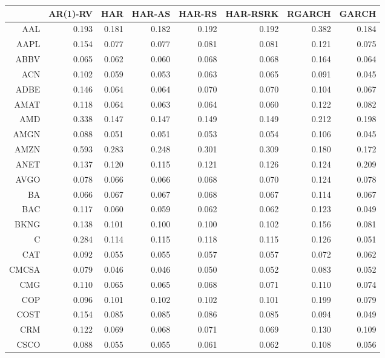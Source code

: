 \begin{table}[ht]
\centering
\begin{tabular}{rrrrrrrr}
  \hline
 & AR(1)-RV & HAR & HAR-AS & HAR-RS & HAR-RSRK & RGARCH & GARCH \\ 
  \hline
AAL & 0.193 & 0.181 & 0.182 & 0.192 & 0.192 & 0.382 & 0.184 \\ 
  AAPL & 0.154 & 0.077 & 0.077 & 0.081 & 0.081 & 0.121 & 0.075 \\ 
  ABBV & 0.065 & 0.062 & 0.060 & 0.068 & 0.068 & 0.164 & 0.064 \\ 
  ACN & 0.102 & 0.059 & 0.053 & 0.063 & 0.065 & 0.091 & 0.045 \\ 
  ADBE & 0.146 & 0.064 & 0.064 & 0.070 & 0.070 & 0.104 & 0.067 \\ 
  AMAT & 0.118 & 0.064 & 0.063 & 0.064 & 0.060 & 0.122 & 0.082 \\ 
  AMD & 0.338 & 0.147 & 0.147 & 0.149 & 0.149 & 0.212 & 0.198 \\ 
  AMGN & 0.088 & 0.051 & 0.051 & 0.053 & 0.054 & 0.106 & 0.045 \\ 
  AMZN & 0.593 & 0.283 & 0.248 & 0.301 & 0.309 & 0.180 & 0.172 \\ 
  ANET & 0.137 & 0.120 & 0.115 & 0.121 & 0.126 & 0.124 & 0.209 \\ 
  AVGO & 0.078 & 0.066 & 0.066 & 0.068 & 0.070 & 0.124 & 0.078 \\ 
  BA & 0.066 & 0.067 & 0.067 & 0.068 & 0.067 & 0.114 & 0.067 \\ 
  BAC & 0.117 & 0.060 & 0.059 & 0.062 & 0.062 & 0.123 & 0.049 \\ 
  BKNG & 0.138 & 0.101 & 0.100 & 0.100 & 0.102 & 0.156 & 0.081 \\ 
  C & 0.284 & 0.114 & 0.115 & 0.118 & 0.115 & 0.126 & 0.051 \\ 
  CAT & 0.092 & 0.055 & 0.055 & 0.057 & 0.057 & 0.072 & 0.062 \\ 
  CMCSA & 0.079 & 0.046 & 0.046 & 0.050 & 0.052 & 0.083 & 0.052 \\ 
  CMG & 0.110 & 0.065 & 0.065 & 0.068 & 0.071 & 0.110 & 0.074 \\ 
  COP & 0.096 & 0.101 & 0.102 & 0.102 & 0.101 & 0.199 & 0.079 \\ 
  COST & 0.154 & 0.085 & 0.085 & 0.086 & 0.085 & 0.094 & 0.049 \\ 
  CRM & 0.122 & 0.069 & 0.068 & 0.071 & 0.069 & 0.130 & 0.109 \\ 
  CSCO & 0.088 & 0.055 & 0.055 & 0.061 & 0.062 & 0.108 & 0.056 \\ 

\end{tabular}
\end{table}
